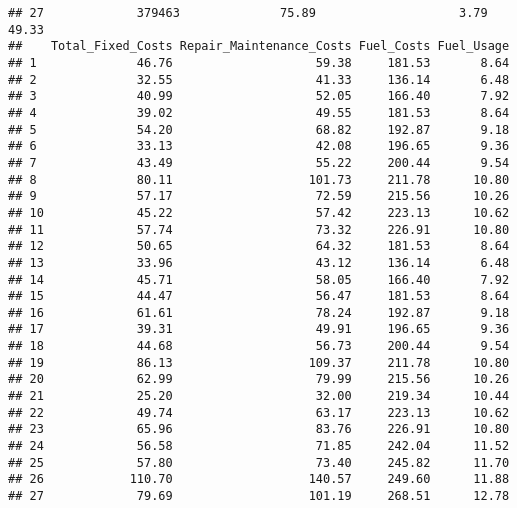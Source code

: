 \documentclass[
]{article}
\begin{document}
\begin{verbatim}
## 27             379463              75.89                    3.79          49.33
##    Total_Fixed_Costs Repair_Maintenance_Costs Fuel_Costs Fuel_Usage
## 1              46.76                    59.38     181.53       8.64
## 2              32.55                    41.33     136.14       6.48
## 3              40.99                    52.05     166.40       7.92
## 4              39.02                    49.55     181.53       8.64
## 5              54.20                    68.82     192.87       9.18
## 6              33.13                    42.08     196.65       9.36
## 7              43.49                    55.22     200.44       9.54
## 8              80.11                   101.73     211.78      10.80
## 9              57.17                    72.59     215.56      10.26
## 10             45.22                    57.42     223.13      10.62
## 11             57.74                    73.32     226.91      10.80
## 12             50.65                    64.32     181.53       8.64
## 13             33.96                    43.12     136.14       6.48
## 14             45.71                    58.05     166.40       7.92
## 15             44.47                    56.47     181.53       8.64
## 16             61.61                    78.24     192.87       9.18
## 17             39.31                    49.91     196.65       9.36
## 18             44.68                    56.73     200.44       9.54
## 19             86.13                   109.37     211.78      10.80
## 20             62.99                    79.99     215.56      10.26
## 21             25.20                    32.00     219.34      10.44
## 22             49.74                    63.17     223.13      10.62
## 23             65.96                    83.76     226.91      10.80
## 24             56.58                    71.85     242.04      11.52
## 25             57.80                    73.40     245.82      11.70
## 26            110.70                   140.57     249.60      11.88
## 27             79.69                   101.19     268.51      12.78
\end{verbatim}
\end{document}
